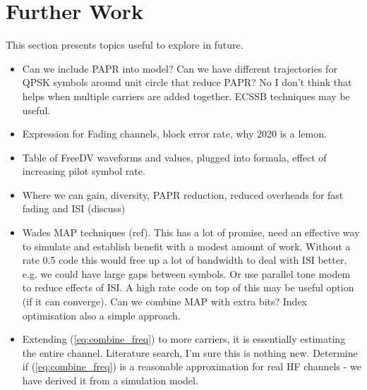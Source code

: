 \documentclass{article}
\begin{document}
\section{Further Work}

This section presents topics useful to explore in future.

\begin{itemize}
\item Can we include PAPR into model? Can we have different trajectories for QPSK symbols around unit circle that reduce PAPR?  No I don't think that helps when multiple carriers are added together.  ECSSB techniques may be useful.
\item Expression for Fading channels, block error rate, why 2020 is a lemon.
\item Table of FreeDV waveforms and values, plugged into formula, effect of increasing pilot symbol rate.
\item Where we can gain, diversity, PAPR reduction, reduced overheads for fast fading and ISI (discuss)
\item Wades MAP techniques (ref).  This has a lot of promise, need an effective way to simulate and establish benefit with a modest amount of work.  Without a rate 0.5 code this would free up a lot of bandwidth to deal with ISI better, e.g. we could have large gaps between symbols.  Or use parallel tone modem to reduce effects of ISI.  A high rate code on top of this may be useful option (if it can converge).   Can we combine MAP with extra bits?  Index optimisation also a simple approach.
\item Extending (\ref{eq:combine_freq}) to more carriers, it is essentially estimating the entire channel.  Literature search, I'm sure this is nothing new.  Determine if (\ref{eq:combine_freq}) is a reasonable approximation for real HF channels - we have derived it from a simulation model.
\end{itemize} 

\nocite{*}


\end{document}
